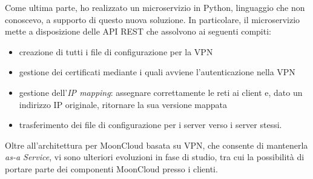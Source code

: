 \documentclass[10pt,a4paper]{article}
\begin{document}
        Come ultima parte, ho realizzato un microservizio in Python, linguaggio che non conoscevo,
        a supporto di questo nuova soluzione.
        In particolare, il microservizio mette a disposizione delle API REST che
        assolvono ai seguenti compiti:
        \begin{itemize}
            \item creazione di tutti i file di configurazione per la VPN
            \item gestione dei certificati mediante i quali avviene l'autenticazione
            nella VPN
            \item gestione dell'\textit{IP mapping}: assegnare correttamente le reti
            ai client e, dato un indirizzo IP originale, ritornare la sua versione mappata
            \item trasferimento dei file di configurazione per i server verso i server stessi.
        \end{itemize}


        Oltre all'architettura per MoonCloud basata su VPN, che consente di mantenerla
        \textit{as-a Service}, vi sono ulteriori evoluzioni in fase di studio, tra cui
        la possibilità di portare parte dei componenti MoonCloud presso i clienti.

    
\end{document}
